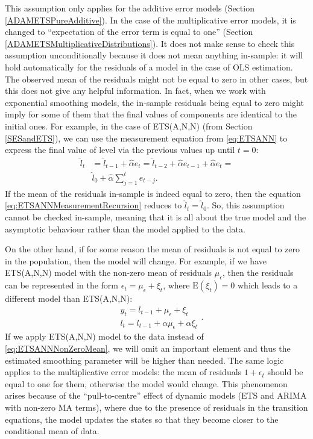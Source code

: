 \documentclass[]{book}
\theoremstyle{definition}
\theoremstyle{definition}
\theoremstyle{definition}
\theoremstyle{definition}
\theoremstyle{remark}
\begin{document}
This assumption only applies for the additive error models (Section \ref{ADAMETSPureAdditive}). In the case of the multiplicative error models, it is changed to ``expectation of the error term is equal to one'' (Section \ref{ADAMETSMultiplicativeDistributions}). It does not make sense to check this assumption unconditionally because it does not mean anything in-sample: it will hold automatically for the residuals of a model in the case of OLS estimation. The observed mean of the residuals might not be equal to zero in other cases, but this does not give any helpful information. In fact, when we work with exponential smoothing models, the in-sample residuals being equal to zero might imply for some of them that the final values of components are identical to the initial ones. For example, in the case of ETS(A,N,N) (from Section \ref{SESandETS}), we can use the measurement equation from \eqref{eq:ETSANN} to express the final value of level via the previous values up until \(t=0\):
\begin{equation}
    \begin{aligned}
        \hat{l}_t &= \hat{l}_{t-1} + \hat{\alpha} e_t = \hat{l}_{t-2} + \hat{\alpha} e_{t-1} + \hat{\alpha} e_t = \\
        & \hat{l}_0 + \hat{\alpha} \sum_{j=1}^t e_{t-j} .
    \end{aligned}
    \label{eq:ETSANNMeasurementRecursion}
\end{equation}
If the mean of the residuals in-sample is indeed equal to zero, then the equation \eqref{eq:ETSANNMeasurementRecursion} reduces to \(\hat{l}_t=\hat{l}_0\). So, this assumption cannot be checked in-sample, meaning that it is all about the true model and the asymptotic behaviour rather than the model applied to the data.

On the other hand, if for some reason the mean of residuals is not equal to zero in the population, then the model will change. For example, if we have ETS(A,N,N) model with the non-zero mean of residuals \(\mu_\epsilon\), then the residuals can be represented in the form \(\epsilon_t = \mu_\epsilon + \xi_t\), where \(\mathrm{E}(\xi_t)=0\) which leads to a different model than ETS(A,N,N):
\begin{equation}
    \begin{aligned}
        & y_t = l_{t-1} + \mu_\epsilon + \xi_t \\
        & l_t = l_{t-1} + \alpha \mu_\epsilon + \alpha \xi_t
    \end{aligned}.
    \label{eq:ETSANNNonZeroMean}
\end{equation}
If we apply ETS(A,N,N) model to the data instead of \eqref{eq:ETSANNNonZeroMean}, we will omit an important element and thus the estimated smoothing parameter will be higher than needed. The same logic applies to the multiplicative error models: the mean of residuals \(1+\epsilon_t\) should be equal to one for them, otherwise the model would change. This phenomenon arises because of the ``pull-to-centre'' effect of dynamic models (ETS and ARIMA with non-zero MA terms), where due to the presence of residuals in the transition equations, the model updates the states so that they become closer to the conditional mean of data.
\end{document}
